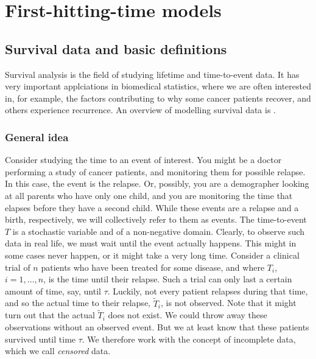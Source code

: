 \chapter{First-hitting-time models}

\section{Survival data and basic definitions}
Survival analysis is the field of studying lifetime and time-to-event data.
It has very important applciations in biomedical statistics, where we are often interested in, for example, the factors contributing to why some cancer patients recover, and others experience recurrence.
An overview of modelling survival data is \citet{ABG}.

\subsection{General idea}
Consider studying the time to an event of interest.
You might be a doctor performing a study of cancer patients, and monitoring them for possible relapse.
In this case, the event is the relapse.
Or, possibly, you are a demographer looking at all parents who have only one child, and you are monitoring the time that elapses before they have a second child.
While these events are a relapse and a birth, respectively, we will collectively refer to them as events.
The time-to-event $T$ is a stochastic variable and of a non-negative domain.
Clearly, to observe such data in real life, we must wait until the event actually happens.
This might in some cases never happen, or it might take a very long time.
Consider a clinical trial of $n$ patients who have been treated for some disease, and where $T_i$, $i=1,\ldots,n$, is the time until their relapse.
Such a trial can only last a certain amount of time, say, until $\tau$.
Luckily, not every patient relapses during that time, and so the actual time to their relapse, $\tilde{T}_i$, is not observed.
Note that it might turn out that the actual $\tilde{T}_i$ does not exist.
We could throw away these observations without an observed event. But we at least know that these patients survived until time $\tau$. We therefore work with the concept of incomplete data, which we call \textit{censored} data.

